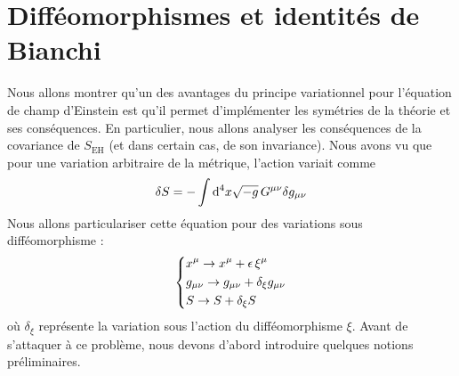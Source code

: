 \section{Difféomorphismes et identités de Bianchi}

Nous allons montrer qu'un des avantages du principe variationnel pour l'équation de champ d'Einstein est qu'il permet d'implémenter les symétries de la théorie et ses conséquences. En particulier, nous allons analyser les conséquences de la covariance de $S_{\text{EH}}$ (et dans certain cas, de son invariance). Nous avons vu que pour une variation arbitraire de la métrique, l'action variait comme 
\begin{equation}
    \delta S = -\int \mathrm{d}^4 x \sqrt{-g}\,G^{\mu\nu}\delta g_{\mu \nu}
    \label{eq:variation de l'action d'Einstein-Hilbert}
\end{equation}
Nous allons particulariser cette équation pour des variations sous difféomorphisme :
\begin{equation}
    \begin{dcases}
        x^{\mu} \to x^{\mu} + \epsilon \, \xi^{\mu}\\
        g_{\mu \nu} \to g_{\mu \nu} + \delta_{\xi}g_{\mu \nu} \\
        S \to S + \delta_{\xi}S
    \end{dcases}
\end{equation}
où $\delta_\xi$ représente la variation sous l'action du difféomorphisme $\xi$. Avant de s'attaquer à ce problème, nous devons d'abord introduire quelques notions préliminaires.
